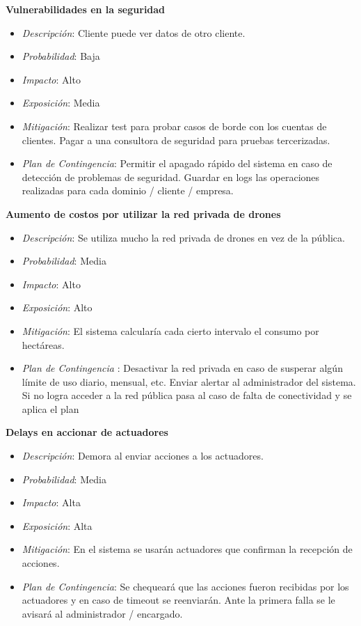 \textbf{Vulnerabilidades en la seguridad}
\begin{itemize}
 \item \textsl{Descripci\'on}: Cliente puede ver datos de otro cliente.
 \item \textsl{Probabilidad}: Baja
 \item \textsl{Impacto}: Alto
 \item \textsl{Exposición}: Media
 \item \textsl{Mitigación}: Realizar test para probar casos de borde con los cuentas de clientes. Pagar a una consultora de seguridad para pruebas tercerizadas.
 \item \textsl{Plan de Contingencia}: Permitir el apagado rápido del sistema en caso de detecci\'on de problemas de seguridad. Guardar en logs las operaciones realizadas para cada dominio / cliente / empresa.
\end{itemize}

\textbf{Aumento de costos por utilizar la red privada de drones}
\begin{itemize}
 \item \textsl{Descripci\'on}: Se utiliza mucho la red privada de drones en vez de la pública.
 \item \textsl{Probabilidad}: Media
 \item \textsl{Impacto}: Alto
 \item \textsl{Exposición}: Alto
 \item \textsl{Mitigación}: El sistema calcularía cada cierto intervalo el consumo por hect\'areas.
 \item \textsl{Plan de Contingencia} : Desactivar la red privada en caso de susperar algún límite de uso diario, mensual, etc. Enviar alertar al administrador del sistema. Si no logra acceder a la red pública pasa al caso de falta de conectividad y se aplica el plan 
\end{itemize}

\clearpage

\textbf{Delays en accionar de actuadores}
\begin{itemize}
 \item \textsl{Descripci\'on}: Demora al enviar acciones a los actuadores.
 \item \textsl{Probabilidad}: Media
 \item \textsl{Impacto}: Alta
 \item \textsl{Exposición}: Alta
 \item \textsl{Mitigación}: En el sistema se usarán actuadores que confirman la recepci\'on de acciones.
 \item \textsl{Plan de Contingencia}: Se chequeará que las acciones fueron recibidas por los actuadores y en caso de timeout se reenviarán. Ante la primera falla se le avisar\'a al administrador / encargado.
\end{itemize}

